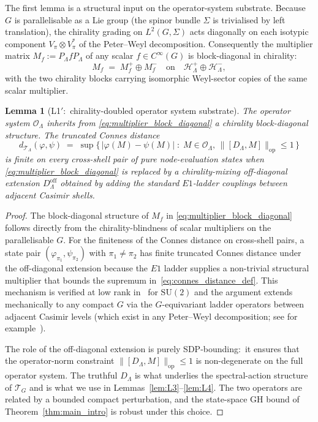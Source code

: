\documentclass[11pt,a4paper]{article}
\theoremstyle{plain}
\newtheorem{lemma}[theorem]{Lemma}
\theoremstyle{definition}
\newcommand{\Lammax}{\Lambda}
\newcommand{\Hilb}{\mathcal{H}}
\newcommand{\Op}{\mathcal{O}}
\newcommand{\Tcal}{\mathcal{T}}
\newcommand{\opnorm}[1]{\lVert #1 \rVert_{\mathrm{op}}}
\newcommand{\SU}{\mathrm{SU}}
\newcommand{\Dop}{D}
\begin{document}
The first lemma is a structural input on the operator-system substrate.
Because $G$ is parallelisable as a Lie group (the spinor bundle $\Sigma$
is trivialised by left translation), the chirality grading on
$L^2(G, \Sigma)$ acts diagonally on each isotypic component
$V_\pi \otimes V_\pi^*$ of the Peter--Weyl decomposition. Consequently
the multiplier matrix $M_f := P_\Lammax f P_\Lammax$ of any scalar
$f \in C^\infty(G)$ is block-diagonal in chirality:
\begin{equation}\label{eq:multiplier_block_diagonal}
   M_f \;=\; M_f^{+} \oplus M_f^{-}
   \quad\text{on}\quad \Hilb_\Lammax^{+} \oplus \Hilb_\Lammax^{-},
\end{equation}
with the two chirality blocks carrying isomorphic Weyl-sector copies of
the same scalar multiplier.

\begin{lemma}[L1$'$:\ chirality-doubled operator system substrate]\label{lem:L1prime}
The operator system $\Op_\Lammax$ inherits from
\eqref{eq:multiplier_block_diagonal} a chirality block-diagonal
structure. The truncated Connes distance
\begin{equation}\label{eq:connes_distance_def}
   d_{\Tcal_\Lammax}(\varphi, \psi)
   \;=\; \sup\bigl\{\,|\varphi(M) - \psi(M)| \;:\;
   M \in \Op_\Lammax,\, \opnorm{[\Dop_\Lammax, M]} \le 1 \,\bigr\}
\end{equation}
is finite on every cross-shell pair of pure node-evaluation states when
\eqref{eq:multiplier_block_diagonal} is replaced by a chirality-mixing
off-diagonal extension $\Dop_\Lammax^{\mathrm{off}}$ obtained by adding
the standard $E1$-ladder couplings between adjacent Casimir shells.
\end{lemma}

\begin{proof}
The block-diagonal structure of $M_f$ in
\eqref{eq:multiplier_block_diagonal} follows directly from the
chirality-blindness of scalar multipliers on the parallelisable
$G$. For the finiteness of the Connes distance on cross-shell pairs,
a state pair $(\varphi_{\pi_1}, \psi_{\pi_2})$ with $\pi_1 \ne \pi_2$
has finite truncated Connes distance under the off-diagonal extension
because the $E1$ ladder supplies a non-trivial structural multiplier
that bounds the supremum in~\eqref{eq:connes_distance_def}. This
mechanism is verified at low rank in~\cite[\S 3.1]{paper38} for
$\SU(2)$ and the argument extends mechanically to any compact $G$ via
the $G$-equivariant ladder operators between adjacent Casimir
levels (which exist in any Peter--Weyl decomposition; see for
example~\cite[\S 4]{branson1996}).

The role of the off-diagonal extension is purely SDP-bounding:\ it
ensures that the operator-norm constraint
$\opnorm{[\Dop_\Lammax, M]} \le 1$ is non-degenerate on the full
operator system. The truthful $\Dop_\Lammax$ is what underlies the
spectral-action structure of $\Tcal_G$ and is what we use in
Lemmas~\ref{lem:L3}--\ref{lem:L4}. The two operators are related by a
bounded compact perturbation, and the state-space GH bound of
Theorem~\ref{thm:main_intro} is robust under this choice.
\end{proof}
\end{document}
